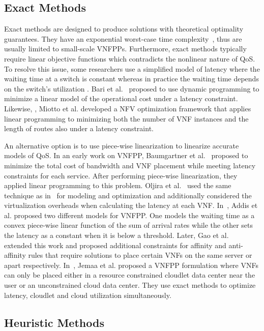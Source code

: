\subsection{Exact Methods}
\label{sec:exact}

Exact methods are designed to produce solutions with theoretical optimality guarantees. They have an exponential worst-case time complexity~\cite{Landa-Silva13}, thus are usually limited to small-scale VNFPPs. Furthermore, exact methods typically require linear objective functions which contradicts the nonlinear nature of QoS. To resolve this issue, some researchers use a simplified model of latency where the waiting time at a switch is constant whereas in practice the waiting time depends on the switch's utilization \cite{IntelDPDK,IntelPPP,OljiraGTB17}. Bari et al.~\cite{BariCAB15} proposed to use dynamic programming to minimize a linear model of the operational cost under a latency constraint. Likewise, \cite{MiottoLCG19}, Miotto et al. developed a NFV optimization framework that applies linear programming to minimizing both the number of VNF instances and the length of routes also under a latency constraint.

An alternative option is to use piece-wise linearization to linearize accurate models of QoS. In an early work on VNFPP, Baumgartner et al.~\cite{BaumgartnerRB15} proposed to minimize the total cost of bandwidth and VNF placement while meeting latency constraints for each service. After performing piece-wise linearization, they applied linear programming to this problem. Oljira et al.~\cite{OljiraGTB17} used the same technique as in~\cite{BaumgartnerRB15} for modeling and optimization and additionally considered the virtualization overheads when calculating the latency at each VNF. In~\cite{AddisBBS15}, Addis et al. proposed two different models for VNFPP. One models the waiting time as a convex piece-wise linear function of the sum of arrival rates while the other sets the latency as a constant when it is below a threshold. Later, Gao et al.~\cite{GaoABS18} extended this work and proposed additional constraints for affinity and anti-affinity rules that require solutions to place certain VNFs on the same server or apart respectively. In~\cite{JemaaPP16}, Jemaa et al. proposed a VNFPP formulation where VNFs can only be placed either in a resource constrained cloudlet data center near the user or an unconstrained cloud data center. They use exact methods to optimize latency, cloudlet and cloud utilization simultaneously.

\subsection{Heuristic Methods}
\label{sec:heuristics}

